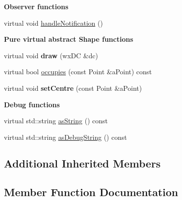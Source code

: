 \begin{Indent}{\bf Observer functions}\par
\begin{DoxyCompactItemize}
\item 
virtual void \hyperlink{class_view_1_1_robot_shape_aa8e3a33d23b11a1f9c4580ff46d3d9f7}{handle\+Notification} ()
\end{DoxyCompactItemize}
\end{Indent}
\begin{Indent}{\bf Pure virtual abstract Shape functions}\par
\begin{DoxyCompactItemize}
\item 
virtual void {\bfseries draw} (wx\+DC \&dc)\hypertarget{class_view_1_1_robot_shape_a9f12f9abfa2d4ebfa47b06e02c71d23c}{}\label{class_view_1_1_robot_shape_a9f12f9abfa2d4ebfa47b06e02c71d23c}

\item 
virtual bool \hyperlink{class_view_1_1_robot_shape_aff3acf7b0326d17f5cabdc19c7164095}{occupies} (const Point \&a\+Point) const 
\item 
virtual void {\bfseries set\+Centre} (const Point \&a\+Point)\hypertarget{class_view_1_1_robot_shape_a4b12a96d27b17153069e8864258f52df}{}\label{class_view_1_1_robot_shape_a4b12a96d27b17153069e8864258f52df}

\end{DoxyCompactItemize}
\end{Indent}
\begin{Indent}{\bf Debug functions}\par
\begin{DoxyCompactItemize}
\item 
virtual std\+::string \hyperlink{class_view_1_1_robot_shape_a2af7fa2dfdf390213a921751fb144afa}{as\+String} () const 
\item 
virtual std\+::string \hyperlink{class_view_1_1_robot_shape_afb69a3cb5c895002b054807d26291579}{as\+Debug\+String} () const 
\end{DoxyCompactItemize}
\end{Indent}
\subsection*{Additional Inherited Members}


\subsection{Member Function Documentation}
